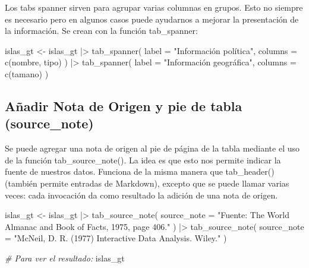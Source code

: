 \documentclass[
]{article}
\newenvironment{Shaded}{\begin{snugshade}}{\end{snugshade}}
\newcommand{\AttributeTok}[1]{\textcolor[rgb]{0.77,0.63,0.00}{#1}}
\newcommand{\CommentTok}[1]{\textcolor[rgb]{0.56,0.35,0.01}{\textit{#1}}}
\newcommand{\FunctionTok}[1]{\textcolor[rgb]{0.00,0.00,0.00}{#1}}
\newcommand{\NormalTok}[1]{#1}
\newcommand{\OtherTok}[1]{\textcolor[rgb]{0.56,0.35,0.01}{#1}}
\newcommand{\SpecialCharTok}[1]{\textcolor[rgb]{0.00,0.00,0.00}{#1}}
\newcommand{\StringTok}[1]{\textcolor[rgb]{0.31,0.60,0.02}{#1}}
\begin{document}
Los tabs spanner sirven para agrupar varias columnas en grupos. Esto no
siempre es necesario pero en algunos casos puede ayudarnos a mejorar la
presentación de la información. Se crean con la función tab\_spanner:

\begin{Shaded}
\begin{Highlighting}[]
\NormalTok{islas\_gt }\OtherTok{\textless{}{-}}\NormalTok{ islas\_gt }\SpecialCharTok{|\textgreater{}} 
  \FunctionTok{tab\_spanner}\NormalTok{(}
    \AttributeTok{label =} \StringTok{"Información política"}\NormalTok{,}
    \AttributeTok{columns =} \FunctionTok{c}\NormalTok{(nombre, tipo)}
\NormalTok{  ) }\SpecialCharTok{|\textgreater{}}
  \FunctionTok{tab\_spanner}\NormalTok{(}
    \AttributeTok{label =} \StringTok{"Información geográfica"}\NormalTok{,}
    \AttributeTok{columns =} \FunctionTok{c}\NormalTok{(tamano)}
\NormalTok{  )}
\end{Highlighting}
\end{Shaded}

\hypertarget{auxf1adir-nota-de-origen-y-pie-de-tabla-source_note}{%
\subsection{Añadir Nota de Origen y pie de tabla
(source\_note)}\label{auxf1adir-nota-de-origen-y-pie-de-tabla-source_note}}

Se puede agregar una nota de origen al pie de página de la tabla
mediante el uso de la función tab\_source\_note(). La idea es que esto
nos permite indicar la fuente de nuestros datos. Funciona de la misma
manera que tab\_header() (también permite entradas de Markdown), excepto
que se puede llamar varias veces: cada invocación da como resultado la
adición de una nota de origen.

\begin{Shaded}
\begin{Highlighting}[]
\NormalTok{islas\_gt }\OtherTok{\textless{}{-}}\NormalTok{ islas\_gt }\SpecialCharTok{|\textgreater{}} 
  \FunctionTok{tab\_source\_note}\NormalTok{(}
    \AttributeTok{source\_note =} \StringTok{"Fuente: The World Almanac and Book of Facts, 1975, page 406."}
\NormalTok{  ) }\SpecialCharTok{|\textgreater{}} 
  \FunctionTok{tab\_source\_note}\NormalTok{(}
    \AttributeTok{source\_note =} \StringTok{"McNeil, D. R. (1977) Interactive Data Analysis. Wiley."}
\NormalTok{  )}

\CommentTok{\# Para ver el resultado:}
\NormalTok{islas\_gt}
\end{Highlighting}
\end{Shaded}
\end{document}
